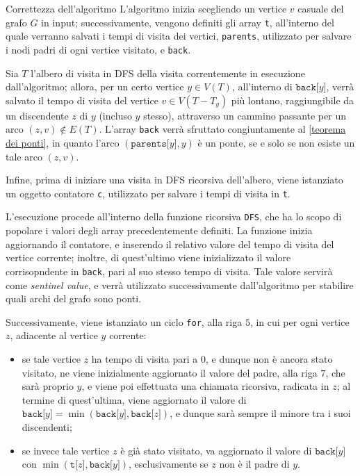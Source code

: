 \documentclass[a4paper, 12pt]{report}
\begin{document}
    \begin{framedobs}{Correttezza dell'algoritmo}
        L'algoritmo inizia scegliendo un vertice $v$ casuale del grafo $G$ in input; successivamente, vengono definiti gli array \texttt{t}, all'interno del quale verranno salvati i tempi di visita dei vertici, \texttt{parents}, utilizzato per salvare i nodi padri di ogni vertice visitato, e \texttt{back}.

        Sia $T$ l'albero di visita in DFS della visita correntemente in esecuzione dall'algoritmo; allora, per un certo vertice $y \in V(T)$, all'interno di $\texttt{back[}y\texttt{]}$, verrà salvato il tempo di visita del vertice $v \in V(T - T_y)$ più lontano, raggiungibile da un discendente $z$ di $y$ (incluso $y$ stesso), attraverso un cammino passante per un arco $(z, v) \notin E(T)$. L'array \texttt{back} verrà sfruttato congiuntamente al \cref{teorema dei ponti}, in quanto l'arco $(\texttt{parents[}y\texttt{]}, y)$ è un ponte, se e solo se non esiste un tale arco $(z, v)$.

        Infine, prima di iniziare una visita in DFS ricorsiva dell'albero, viene istanziato un oggetto contatore \texttt{c}, utilizzato per salvare i tempi di visita in \texttt{t}.

        L'esecuzione procede all'interno della funzione ricorsiva \texttt{DFS}, che ha lo scopo di popolare i valori degli array precedentemente definiti. La funzione inizia aggiornando il contatore, e inserendo il relativo valore del tempo di visita del vertice corrente; inoltre, di quest'ultimo viene inizializzato il valore corrisopndente in \texttt{back}, pari al suo stesso tempo di visita. Tale valore servirà come \textit{sentinel value}, e verrà utilizzato successivamente dall'algoritmo per stabilire quali archi del grafo sono ponti.

        Successivamente, viene istanziato un ciclo \texttt{for}, alla riga $5$, in cui per ogni vertice $z$, adiacente al vertice $y$ corrente:
        \begin{itemize}
            \item se tale vertice $z$ ha tempo di visita pari a $0$, e dunque non è ancora stato visitato, ne viene inizialmente aggiornato il valore del padre, alla riga $7$, che sarà proprio $y$, e viene poi effettuata una chiamata ricorsiva, radicata in $z$; al termine di quest'ultima, viene aggiornato il valore di $\texttt{back[}y\texttt{]} = \min(\texttt{back[}y\texttt{]}, \texttt{back[}z\texttt{]})$, e dunque sarà sempre il minore tra i suoi discendenti;
            \item se invece tale vertice $z$ è già stato visitato, va aggiornato il valore di $\texttt{back[}y\texttt{]}$ con $\min(\texttt{t[}z\texttt{]}, \texttt{back[}y\texttt{]})$, esclusivamente se $z$ non è il padre di $y$.
        \end{itemize}


\end{framedobs}
\end{document}
